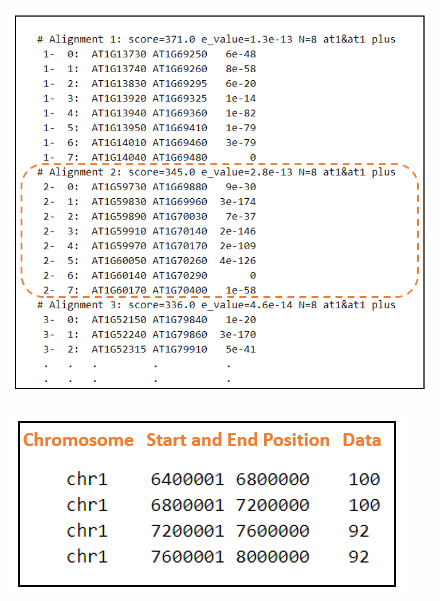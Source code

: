 \begin{figure}[h]
  \centering
  \includegraphics[width=.675\linewidth]{images/ch_3_coll_file.PNG}
  \label{fig:ch_3_coll_file}
\end{figure}

\begin{figure}[h]
  \centering
  \includegraphics[width=.45\linewidth]{images/ch_3_track_file.PNG}
  \label{fig:ch_3_track_file}
\end{figure}


